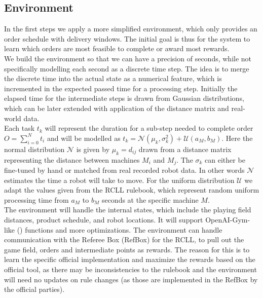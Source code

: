 \documentclass[runningheads,envcountsect]{llncs}
\begin{document}
\subsection{Environment} \label{env}
In the first steps we apply a more simplified environment, which only provides an order schedule with delivery windows. The initial goal is thus for the system to learn which orders are most feasible to complete or award most rewards.\\
We build the environment so that we can have a precision of seconds, while not specifically modelling each second as a discrete time step. The idea is to merge the discrete time into the actual state as a numerical feature, which is incremented in the expected passed time for a processing step. Initially the elapsed time for the intermediate steps is drawn from Gaussian distributions, which can be later extended with application of the distance matrix and real-world data.\\
Each task $t_k$ will represent the duration for a sub-step needed to complete order $O=\sum_{i=0}^N t_i$ and will be modelled as $t_k = \mathcal{N}(\mu_k, \sigma_k^2) + \mathcal{U}(a_M,b_M)$. Here the normal distribution $\mathcal{N}$ is given by $\mu_k=d_{ij}$ drawn from a distance matrix representing the distance between machines $M_i$ and $M_j$. The $\sigma_k$ can either be fine-tuned by hand or matched from real recorded robot data. In other words $\mathcal{N}$ estimates the time a robot will take to move. For the uniform distribution $\mathcal{U}$ we adapt the values given from the RCLL rulebook, which represent random uniform processing time from $a_M$ to $b_M$ seconds at the specific machine $M$.\\
The environment will handle the internal states, which include the playing field distances, product schedule, and robot locations. It will support OpenAI-Gym-like (\cite{OpenAIgym}) functions and more optimizations. The environment can handle communication with the Referee Box (RefBox) for the RCLL, to pull out the game field, orders and intermediate points as rewards. The reason for this is to learn the specific official implementation and maximize the rewards based on the official tool, as there may be inconsistencies to the rulebook and the environment will need no updates on rule changes (as those are implemented in the RefBox by the official parties).
\end{document}
